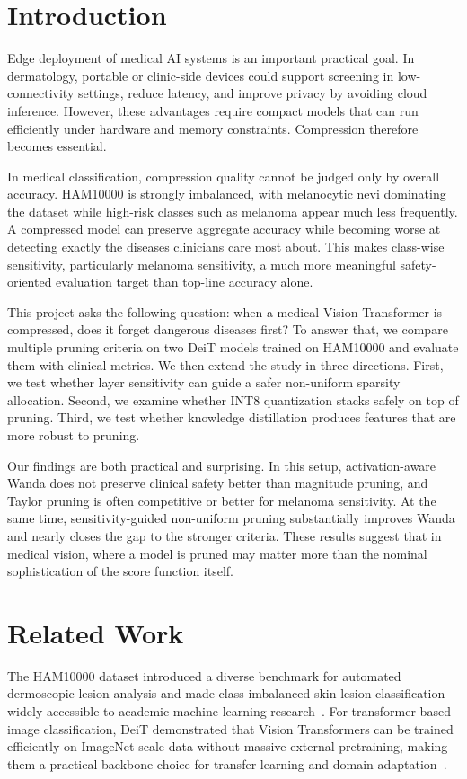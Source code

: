 \documentclass[11pt]{article}
\begin{document}
\section{Introduction}
Edge deployment of medical AI systems is an important practical goal. In dermatology, portable or clinic-side devices could support screening in low-connectivity settings, reduce latency, and improve privacy by avoiding cloud inference. However, these advantages require compact models that can run efficiently under hardware and memory constraints. Compression therefore becomes essential.

In medical classification, compression quality cannot be judged only by overall accuracy. HAM10000 is strongly imbalanced, with melanocytic nevi dominating the dataset while high-risk classes such as melanoma appear much less frequently. A compressed model can preserve aggregate accuracy while becoming worse at detecting exactly the diseases clinicians care most about. This makes class-wise sensitivity, particularly melanoma sensitivity, a much more meaningful safety-oriented evaluation target than top-line accuracy alone.

This project asks the following question: when a medical Vision Transformer is compressed, does it forget dangerous diseases first? To answer that, we compare multiple pruning criteria on two DeiT models trained on HAM10000 and evaluate them with clinical metrics. We then extend the study in three directions. First, we test whether layer sensitivity can guide a safer non-uniform sparsity allocation. Second, we examine whether INT8 quantization stacks safely on top of pruning. Third, we test whether knowledge distillation produces features that are more robust to pruning.

Our findings are both practical and surprising. In this setup, activation-aware Wanda does not preserve clinical safety better than magnitude pruning, and Taylor pruning is often competitive or better for melanoma sensitivity. At the same time, sensitivity-guided non-uniform pruning substantially improves Wanda and nearly closes the gap to the stronger criteria. These results suggest that in medical vision, where a model is pruned may matter more than the nominal sophistication of the score function itself.

\section{Related Work}
The HAM10000 dataset introduced a diverse benchmark for automated dermoscopic lesion analysis and made class-imbalanced skin-lesion classification widely accessible to academic machine learning research~\cite{tschandl2018ham10000}. For transformer-based image classification, DeiT demonstrated that Vision Transformers can be trained efficiently on ImageNet-scale data without massive external pretraining, making them a practical backbone choice for transfer learning and domain adaptation~\cite{touvron2021deit}.
\end{document}
